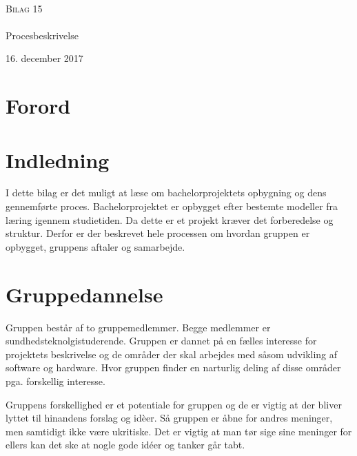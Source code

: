 


\begin{titlingpage}
\begin{center}

~ \\[3cm]


\textsc{\LARGE Bilag 15}\\[1.5cm]


\noindent\makebox[\linewidth]{\rule{\textwidth}{0.4pt}}\\
[0.5cm]{\Huge Procesbeskrivelse}
\noindent\makebox[\linewidth]{\rule{\textwidth}{0.4pt}}
\end{center}
\vfill
\begin{center}
{\large 16. december 2017}
\end{center}
\end{titlingpage}

\newpage
\tableofcontents

 \chapter{Forord} 
 \chapter{Indledning}
 I dette bilag er det muligt at læse om bachelorprojektets opbygning og dens gennemførte proces. Bachelorprojektet er opbygget efter bestemte modeller fra læring igennem studietiden. Da dette er et projekt kræver det forberedelse og struktur. Derfor er der beskrevet hele processen om hvordan gruppen er opbygget, gruppens aftaler og samarbejde.

\chapter{Gruppedannelse}
Gruppen består af to gruppemedlemmer. Begge medlemmer er sundhedsteknolgistuderende. Gruppen er dannet på en fælles interesse for projektets beskrivelse og de områder der skal arbejdes med såsom udvikling af software og hardware. Hvor gruppen finder en narturlig deling af disse områder pga. forskellig interesse. 

Gruppens forskellighed er et potentiale for gruppen og de er vigtig at der bliver lyttet til hinandens forslag og idèer. Så gruppen er åbne for andres meninger, men samtidigt ikke være ukritiske. Det er vigtig at man tør sige sine meninger for ellers kan det ske at nogle gode idéer og tanker går tabt.

